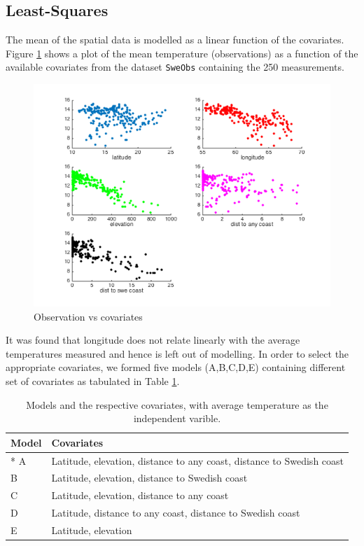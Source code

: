 \documentclass[a4paper,10pt]{article}
\begin{document}
\subsection{Least-Squares}
The mean of the spatial data is modelled as a linear function of the covariates. Figure \ref{fig:covariates} shows a plot of the mean temperature (observations) as a function of the available covariates from the dataset {\texttt{SweObs}} containing the 250 measurements.
\begin{figure}[ht]
	\includegraphics[width=0.8\linewidth]{covariates.png}
	\caption{Observation vs covariates}
	\label{fig:covariates}
\end{figure}
It was found that longitude does not relate linearly with the average temperatures measured and hence is left out of modelling. In order to select the appropriate covariates, we formed five models (A,B,C,D,E) containing different set of covariates as tabulated in Table \ref{tab:models}.
\begin{table}[H]
\centering
\begin{tabular}{lp{9cm}}
\hline
{\bf Model} & {\bf Covariates} \\
\hline
* A & Latitude, elevation, distance to any coast, distance to Swedish coast\\
 B & Latitude, elevation, distance to Swedish coast\\
 C & Latitude, elevation, distance to any coast\\
 D & Latitude, distance to any coast, distance to Swedish coast\\
 E & Latitude, elevation\\
\hline
\end{tabular}
\caption{Models and the respective covariates, with average temperature as the independent varible.}
\label{tab:models}
\end{table}
\end{document}
